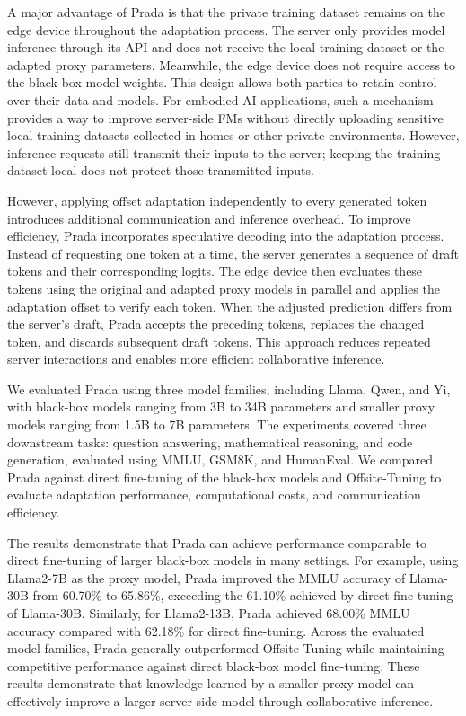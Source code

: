 \documentclass[11pt]{article}
\begin{document}
A major advantage of Prada is that the private training dataset remains on the edge device throughout the adaptation process. The server only provides model inference through its API and does not receive the local training dataset or the adapted proxy parameters. Meanwhile, the edge device does not require access to the black-box model weights. This design allows both parties to retain control over their data and models. For embodied AI applications, such a mechanism provides a way to improve server-side FMs without directly uploading sensitive local training datasets collected in homes or other private environments. However, inference requests still transmit their inputs to the server; keeping the training dataset local does not protect those transmitted inputs.

However, applying offset adaptation independently to every generated token introduces additional communication and inference overhead. To improve efficiency, Prada incorporates speculative decoding into the adaptation process. Instead of requesting one token at a time, the server generates a sequence of draft tokens and their corresponding logits. The edge device then evaluates these tokens using the original and adapted proxy models in parallel and applies the adaptation offset to verify each token. When the adjusted prediction differs from the server's draft, Prada accepts the preceding tokens, replaces the changed token, and discards subsequent draft tokens. This approach reduces repeated server interactions and enables more efficient collaborative inference.

We evaluated Prada using three model families, including Llama, Qwen, and Yi, with black-box models ranging from 3B to 34B parameters and smaller proxy models ranging from 1.5B to 7B parameters. The experiments covered three downstream tasks: question answering, mathematical reasoning, and code generation, evaluated using MMLU, GSM8K, and HumanEval. We compared Prada against direct fine-tuning of the black-box models and Offsite-Tuning to evaluate adaptation performance, computational costs, and communication efficiency.

The results demonstrate that Prada can achieve performance comparable to direct fine-tuning of larger black-box models in many settings. For example, using Llama2-7B as the proxy model, Prada improved the MMLU accuracy of Llama-30B from 60.70\% to 65.86\%, exceeding the 61.10\% achieved by direct fine-tuning of Llama-30B. Similarly, for Llama2-13B, Prada achieved 68.00\% MMLU accuracy compared with 62.18\% for direct fine-tuning. Across the evaluated model families, Prada generally outperformed Offsite-Tuning while maintaining competitive performance against direct black-box model fine-tuning. These results demonstrate that knowledge learned by a smaller proxy model can effectively improve a larger server-side model through collaborative inference.
\end{document}
